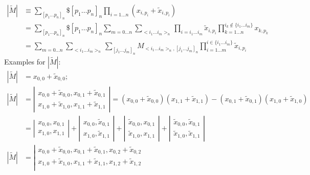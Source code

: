 \documentclass[twoside]{article}
\numberwithin{equation}{section}
\begin{document}
\begin{align*}
|\widetilde{M}| &\equiv \sum_{[p_1\dots p_n]_n} \$ [p_1\dots p_n]_n  \prod_{i=1 \dots n} (x_{i,p_i} + \tilde{x}_{i,p_{i}}) \\
	&= \sum_{[p_1 \dots p_{n}]_n} \$[p_1 \dots p_{n}]_n \sum_{m=0 \dots n} \sum_{<i_1 \dots i_m>_n}
		\prod_{i=i_1 \dots i_m} \tilde{x}_{i,p_{i}} \prod_{k = 1 \dots n }^{i_k \not \in \{i_1 \dots i_m\}} x_{k, p_{k}} \\
	&= \sum_{m=0 \dots n} \sum_{<i_1 \dots i_m>_n} \sum_{[j_1 \dots j_{m}]_n} 
		M_{<i_1 \dots i_m>_n, [j_1 \dots j_{m}]_n} \prod_{i=1 \dots m}^{i \in \{i_1 \dots i_m\}} \tilde{x}_{i,p_{i}}
\end{align*}
Examples for $|\widetilde{M}|$:
\begin{align*}
|\tilde{M}| &= x_{0,0} + \tilde{x}_{0,0}; \\
|\tilde{M}| &= \left| \begin{matrix} 
            x_{0,0} + \tilde{x}_{0,0}, x_{0,1} + \tilde{x}_{0,1} \\ 
			x_{1,0} + \tilde{x}_{1,0}, x_{1,1} + \tilde{x}_{1,1} \end{matrix} \right| 
	= (x_{0,0} + \tilde{x}_{0,0})(x_{1,1} + \tilde{x}_{1,1}) - (x_{0,1} + \tilde{x}_{0,1})(x_{1,0} + \tilde{x}_{1,0}) \\
	&= \left| \begin{matrix}  x_{0,0}, x_{0,1} \\  x_{1,0},  x_{1,1} \end{matrix} \right| 
	  + \left| \begin{matrix}  x_{0,0}, \tilde{x}_{0,1} \\  x_{1,0},  \tilde{x}_{1,1} \end{matrix} \right|
	  + \left| \begin{matrix}  \tilde{x}_{0,0}, x_{0,1} \\  \tilde{x}_{1,0},  x_{1,1} \end{matrix} \right|
	  + \left| \begin{matrix}  \tilde{x}_{0,0}, \tilde{x}_{0,1} \\  \tilde{x}_{1,0}, \tilde{x}_{1,1} \end{matrix} \right| \\
|\tilde{M}| &= \left| \begin{matrix} 
            x_{0,0} + \tilde{x}_{0,0}, x_{0,1} + \tilde{x}_{0,1}, x_{0,2} + \tilde{x}_{0,2} \\ 
			x_{1,0} + \tilde{x}_{1,0}, x_{1,1} + \tilde{x}_{1,1}, x_{1,2} + \tilde{x}_{1,2} \\ 

\end{matrix}
\end{align*}
\end{document}
